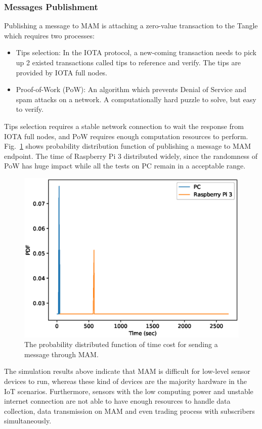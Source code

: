 \documentclass[conference]{IEEEtran}
\begin{document}
\subsubsection{Messages Publishment}
Publishing a message to MAM is attaching a zero-value transaction to the Tangle which requires two processes:
\begin{itemize}
	\item	Tips selection: In the IOTA protocol, a new-coming transaction needs to pick up 2 existed transactions called tips to reference and verify. The tips are provided by IOTA full nodes.
	\item	Proof-of-Work (PoW): An algorithm which prevents Denial of Service and spam attacks on a network. A computationally hard puzzle to solve, but easy to verify.
\end{itemize}

Tips selection requires a stable network connection to wait the response from IOTA full nodes, and PoW requires enough computation resources to perform. Fig.~\ref{fig:mam_send} shows probability distribution function of publishing a message to MAM endpoint. The time of Raspberry Pi 3 distributed widely, since the randomness of PoW has huge impact while all the tests on PC remain in a acceptable range.

\begin{figure}[!t]
    \centering
    \includegraphics[width=3.in]{mam_send}
    \caption{The probability distributed function of time cost for sending a message through MAM.}
    \label{fig:mam_send}
\end{figure}

The simulation results above indicate that MAM is difficult for low-level sensor devices to run, whereas these kind of devices are the majority hardware in the IoT scenarios. Furthermore, sensors with the low computing power and unstable internet connection are not able to have enough resources to handle data collection, data transmission on MAM and even trading process with subscribers simultaneously. 
\end{document}
